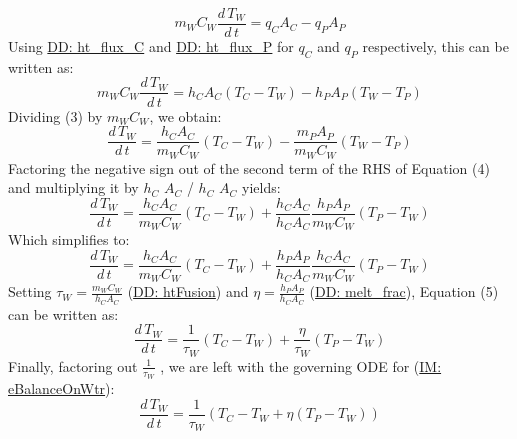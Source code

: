 \documentclass[12pt]{article}
\begin{document}
\begin{dmath}
{m_{W}} {C_{W}} \frac{d\,{T_{W}}}{d\,t}={q_{C}} {A_{C}}-{q_{P}} {A_{P}}
\end{dmath}
Using \hyperref[DD:ht.flux.C]{DD: ht\_flux\_C} and \hyperref[DD:ht.flux.P]{DD: ht\_flux\_P} for ${q_{C}}$ and ${q_{P}}$ respectively, this can be written as:
\begin{dmath}
{m_{W}} {C_{W}} \frac{d\,{T_{W}}}{d\,t}={h_{C}} {A_{C}} \left({T_{C}}-{T_{W}}\right)-{h_{P}} {A_{P}} \left({T_{W}}-{T_{P}}\right)
\end{dmath}
Dividing (3) by ${m_{W}}$${C_{W}}$, we obtain:
\begin{dmath}
\frac{d\,{T_{W}}}{d\,t}=\frac{{h_{C}} {A_{C}}}{{m_{W}} {C_{W}}} \left({T_{C}}-{T_{W}}\right)-\frac{{m_{P}} {A_{P}}}{{m_{W}} {C_{W}}} \left({T_{W}}-{T_{P}}\right)
\end{dmath}
Factoring the negative sign out of the second term of the RHS of Equation (4) and multiplying it by ${h_{C}}$ ${A_{C}}$ / ${h_{C}}$ ${A_{C}}$ yields:
\begin{dmath}
\frac{d\,{T_{W}}}{d\,t}=\frac{{h_{C}} {A_{C}}}{{m_{W}} {C_{W}}} \left({T_{C}}-{T_{W}}\right)+\frac{{h_{C}} {A_{C}}}{{h_{C}} {A_{C}}} \frac{{h_{P}} {A_{P}}}{{m_{W}} {C_{W}}} \left({T_{P}}-{T_{W}}\right)
\end{dmath}
Which simplifies to:
\begin{dmath}
\frac{d\,{T_{W}}}{d\,t}=\frac{{h_{C}} {A_{C}}}{{m_{W}} {C_{W}}} \left({T_{C}}-{T_{W}}\right)+\frac{{h_{P}} {A_{P}}}{{h_{C}} {A_{C}}} \frac{{h_{C}} {A_{C}}}{{m_{W}} {C_{W}}} \left({T_{P}}-{T_{W}}\right)
\end{dmath}
Setting ${τ_{W}}=\frac{{m_{W}} {C_{W}}}{{h_{C}} {A_{C}}}$ (\hyperref[DD:htFusion]{DD: htFusion}) and $η=\frac{{h_{P}} {A_{P}}}{{h_{C}} {A_{C}}}$ (\hyperref[DD:melt.frac]{DD: melt\_frac}), Equation (5) can be written as:
\begin{dmath}
\frac{d\,{T_{W}}}{d\,t}=\frac{1}{{τ_{W}}} \left({T_{C}}-{T_{W}}\right)+\frac{η}{{τ_{W}}} \left({T_{P}}-{T_{W}}\right)
\end{dmath}
Finally, factoring out $\frac{1}{{τ_{W}}}$ , we are left with the governing ODE for (\hyperref[IM:eBalanceOnWtr]{IM: eBalanceOnWtr}):
\begin{dmath}
\frac{d\,{T_{W}}}{d\,t}=\frac{1}{{τ_{W}}} \left({T_{C}}-{T_{W}}+η \left({T_{P}}-{T_{W}}\right)\right)
\end{dmath}
~\newline
\noindent \begin{minipage}{\textwidth}
\begin{tabular}{p{} p{}}

\end{tabular}
\end{minipage}$$
\end{document}
